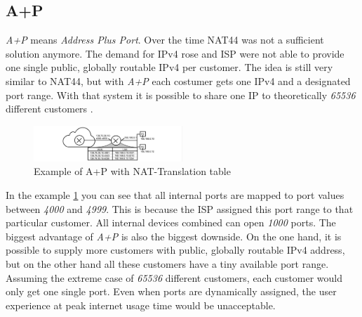 \documentclass[format=sigconf, natbib=true, nonacm=true]{acmart}
\begin{document}
    \subsection{A+P}
    \textit{A+P} means \textit{Address Plus Port}. Over the time NAT44 was not a sufficient solution anymore. The demand for IPv4 rose and ISP were not able to provide one single public, globally routable IPv4 per customer. The idea is still very similar to NAT44, but with \textit{A+P} each costumer gets one IPv4 and a designated port range. With that system it is possible to share one IP to theoretically \textit{65536} different customers \cite{8716482}.
    \begin{figure}
        \centering
        \includegraphics[width=0.5\textwidth]{images/a_plus_p.png}
        \caption{Example of A+P with NAT-Translation table}
        \label{fig:a_plus_p}
    \end{figure}
    In the example \ref{fig:a_plus_p} you can see that all internal ports are mapped to port values between \textit{4000} and \textit{4999}. This is because the ISP assigned this port range to that particular customer. All internal devices combined can open \textit{1000} ports. The biggest advantage of \textit{A+P} is also the biggest downside. On the one hand, it is possible to supply more customers with public, globally routable IPv4 address, but on the other hand all these customers have a tiny available port range. Assuming the extreme case of \textit{65536} different customers, each customer would only get one single port. Even when ports are dynamically assigned, the user experience at peak internet usage time would be unacceptable.
\end{document}
